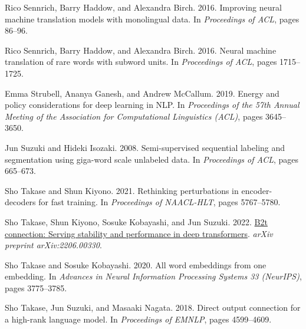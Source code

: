 \documentclass[11pt]{article}
\begin{document}
\begin{thebibliography}{37}
Rico Sennrich, Barry Haddow, and Alexandra Birch. 2016{}.
\newblock Improving neural machine translation models with monolingual data.
\newblock In \emph{Proceedings of ACL}, pages 86--96.

Rico Sennrich, Barry Haddow, and Alexandra Birch. 2016{}.
\newblock Neural machine translation of rare words with subword units.
\newblock In \emph{Proceedings of ACL}, pages 1715--1725.

Emma Strubell, Ananya Ganesh, and Andrew McCallum. 2019.
\newblock Energy and policy considerations for deep learning in {NLP}.
\newblock In \emph{Proceedings of the 57th Annual Meeting of the Association
  for Computational Linguistics (ACL)}, pages 3645--3650.

Jun Suzuki and Hideki Isozaki. 2008.
\newblock Semi-supervised sequential labeling and segmentation using giga-word
  scale unlabeled data.
\newblock In \emph{Proceedings of ACL}, pages 665--673.

Sho Takase and Shun Kiyono. 2021.
\newblock Rethinking perturbations in encoder-decoders for fast training.
\newblock In \emph{Proceedings of NAACL-HLT}, pages 5767--5780.

Sho Takase, Shun Kiyono, Sosuke Kobayashi, and Jun Suzuki. 2022.
\newblock \href {https://arxiv.org/abs/2206.00330} {B2t connection: Serving
  stability and performance in deep transformers}.
\newblock \emph{arXiv preprint arXiv:2206.00330}.

Sho Takase and Sosuke Kobayashi. 2020.
\newblock All word embeddings from one embedding.
\newblock In \emph{Advances in Neural Information Processing Systems 33
  (NeurIPS)}, pages 3775--3785.

Sho Takase, Jun Suzuki, and Masaaki Nagata. 2018.
\newblock Direct output connection for a high-rank language model.
\newblock In \emph{Proceedings of EMNLP}, pages 4599--4609.


\end{thebibliography}
\end{document}
